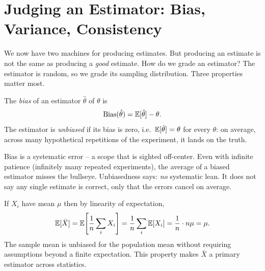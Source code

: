 \section{Judging an Estimator: Bias, Variance, Consistency}
\label{ch30:bias}

We now have two machines for producing estimates. But producing an estimate is
not the same as producing a \emph{good} estimate. How do we grade an estimator?
The estimator is random, so we grade its sampling distribution. Three properties
matter most.

\begin{definition}[Bias]
\label{ch30:def-bias}
The \emph{bias} of an estimator $\hat\theta$ of $\theta$ is
\[
  \operatorname{Bias}(\hat\theta) = \operatorname{\mathbb{E}}[\hat\theta] - \theta.
\]
The estimator is \emph{unbiased} if its bias is zero, i.e.\
$\operatorname{\mathbb{E}}[\hat\theta]=\theta$ for every $\theta$: on average, across many hypothetical
repetitions of the experiment, it lands on the truth.
\end{definition}

\begin{intuitionbox}
Bias is a systematic error -- a scope that is sighted off-center. Even with
infinite patience (infinitely many repeated experiments), the average of a
biased estimator misses the bullseye. Unbiasedness says: \emph{no} systematic
lean. It does not say any single estimate is correct, only that the errors
cancel on average.
\end{intuitionbox}

\begin{example}
\label{ch30:ex-unbiased-mean}
If $X_i$ have mean $\mu$ then by linearity of expectation,
\[
  \operatorname{\mathbb{E}}[\bar X] = \operatorname{\mathbb{E}}\!\left[\frac1n\sum_i X_i\right]
             = \frac1n\sum_i \operatorname{\mathbb{E}}[X_i] = \frac1n\cdot n\mu = \mu.
\]
The sample mean is unbiased for the population mean without requiring
assumptions beyond a finite expectation. This property makes $\bar X$ a primary estimator across
statistics.
\end{example}

